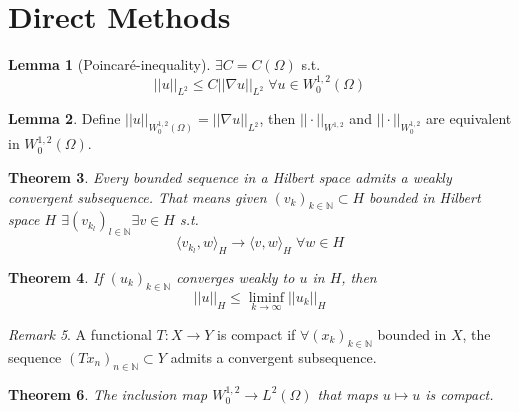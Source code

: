 \documentclass[a4paper, 12pt]{article}
\theoremstyle{plain}
\newtheorem{theorem}{Theorem}[section] %
\theoremstyle{definition}
\theoremstyle{lemma}
\newtheorem{lemma}[theorem]{Lemma}
\theoremstyle{remark}
\newtheorem{remark}[theorem]{Remark}
\theoremstyle{corollary}
\theoremstyle{example}
\begin{document}
	\section{Direct Methods}
	\begin{lemma}[Poincaré-inequality]
		$\exists C = C(\Omega)$ s.t. \[||u||_{L^2} \leq C||\nabla u||_{L^2} \; \forall u \in W_0^{1,2}(\Omega)\]
	\end{lemma}
	\begin{lemma}
		Define $||u||_{W_0^{1,2}(\Omega)} = ||\nabla u||_{L^2}$, then $||\cdot ||_{W^{1,2}}$ and $||\cdot ||_{W_0^{1,2}}$ are equivalent in $W_0^{1,2}(\Omega)$.
	\end{lemma}
	\begin{theorem}
		Every bounded sequence in a Hilbert space admits a weakly convergent subsequence. That means given $(v_k)_{k \in \mathbb{N}} \subset H$ bounded in Hilbert space $H$ $\exists (v_{k_l})_{l \in \mathbb{N}} \exists v \in H$ s.t. \[\langle v_{k_l}, w\rangle_H \to \langle v, w\rangle_H \; \forall w \in H\]
	\end{theorem}
	\begin{theorem}
		If $(u_k)_{k \in \mathbb{N}}$ converges weakly to $u$ in $H$, then \[||u||_H \leq \liminf_{k \to \infty} ||u_k||_H\]
	\end{theorem}
	\begin{remark}
		A functional $T:X\to Y$ is compact if $\forall (x_k)_{k \in \mathbb{N}}$ bounded in $X$, the sequence $(Tx_n)_{n \in \mathbb{N}} \subset Y$ admits a convergent subsequence.
	\end{remark}
	\begin{theorem}
		The inclusion map $W_0^{1,2} \rightarrow L^2(\Omega)$ that maps $u \mapsto u$ is compact.
	\end{theorem}
\end{document}
